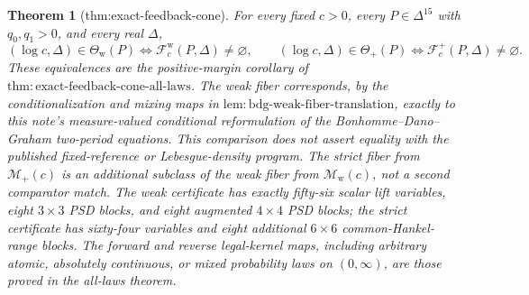 \documentclass{article}
\newtheorem{theorem}{Theorem}
\begin{document}
\begin{theorem}[thm:exact-feedback-cone]\label{thm:exact-feedback-cone}
For every fixed \(c>0\), every \(P\in\Delta^{15}\) with \(q_0,q_1>0\), and every real \(\Delta\),
\[
 (\log c,\Delta)\in\Theta_{\mathrm w}(P)
 \Longleftrightarrow\mathcal F_c^{\mathrm w}(P,\Delta)\ne\varnothing,
 \qquad
 (\log c,\Delta)\in\Theta_+(P)
 \Longleftrightarrow\mathcal F_c^+(P,\Delta)\ne\varnothing.
\]
These equivalences are the positive-margin corollary of \(\mathrm{thm{:}exact\text{-}feedback\text{-}cone\text{-}all\text{-}laws}\).  The weak fiber corresponds, by the conditionalization and mixing maps in \(\mathrm{lem{:}bdg\text{-}weak\text{-}fiber\text{-}translation}\), exactly to this note's measure-valued conditional reformulation of the Bonhomme--Dano--Graham two-period equations.  This comparison does not assert equality with the published fixed-reference or Lebesgue-density program.  The strict fiber from \(\mathcal M_+(c)\) is an additional subclass of the weak fiber from \(\mathcal M_{\mathrm w}(c)\), not a second comparator match.  The weak certificate has exactly fifty-six scalar lift variables, eight \(3\times3\) PSD blocks, and eight augmented \(4\times4\) PSD blocks; the strict certificate has sixty-four variables and eight additional \(6\times6\) common-Hankel-range blocks.  The forward and reverse legal-kernel maps, including arbitrary atomic, absolutely continuous, or mixed probability laws on \((0,\infty)\), are those proved in the all-laws theorem.
\end{theorem}
\end{document}
